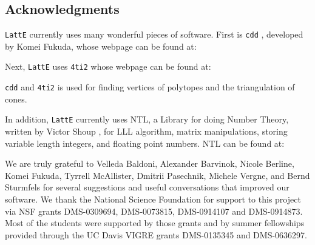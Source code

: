 \documentclass{article}
\newcommand{\latte}{{\tt LattE}\xspace}
\newcommand{\fourtitwo}{{\tt 4ti2}\xspace}
\begin{document}
\subsection{Acknowledgments}

\par {\tt LattE} currently uses many wonderful pieces of software.
First is {\tt cdd} \cite{fukuda}, developed by Komei Fukuda, whose webpage can be
found at:


Next, \latte uses \fourtitwo \cite{4ti2} whose webpage can be found at:


{\tt cdd} and \fourtitwo is used for finding vertices of polytopes and the
triangulation of cones.

In addition, {\tt LattE} currently uses NTL, a
Library for doing Number Theory, written by Victor Shoup \cite{shoup},
for LLL algorithm, matrix manipulations, storing variable length
integers, and floating point numbers.  NTL can be found at:


We are truly grateful to Velleda Baldoni, Alexander Barvinok, Nicole Berline, Komei Fukuda, Tyrrell McAllister, Dmitrii Pasechnik, Michele Vergne, and Bernd Sturmfels for several suggestions and
useful conversations that improved our software.  We thank the National
Science Foundation for support to this project via NSF grants DMS-0309694, 
DMS-0073815, DMS-0914107 and DMS-0914873. Most of the students were supported by those
grants and by summer fellowships provided through the UC Davis VIGRE grants
DMS-0135345 and DMS-0636297.





\end{document}
